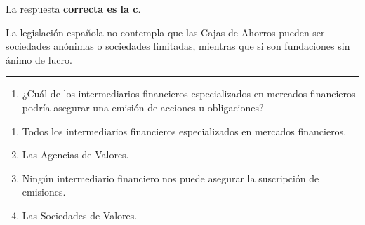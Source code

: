 \documentclass[
  letterpaper,
  DIV=11,
  numbers=noendperiod]{scrreprt}
\providecommand{\tightlist}{%
  \setlength{\itemsep}{0pt}\setlength{\parskip}{0pt}}\usepackage{longtable,booktabs,array}
\begin{document}
\begin{tcolorbox}[enhanced jigsaw, left=2mm, opacityback=0, colback=white, breakable, arc=.35mm, bottomrule=.15mm, rightrule=.15mm, toprule=.15mm, leftrule=.75mm, colframe=quarto-callout-tip-color-frame]
\begin{minipage}[t]{5.5mm}
\textcolor{quarto-callout-tip-color}{\faLightbulb}
\end{minipage}%
\begin{minipage}[t]{\textwidth - 5.5mm}

La respuesta \textbf{correcta es la c}.

La legislación española no contempla que las Cajas de Ahorros pueden ser
sociedades anónimas o sociedades limitadas, mientras que si son
fundaciones sin ánimo de lucro.

\end{minipage}%
\end{tcolorbox}

\begin{center}\rule{0.5\linewidth}{0.5pt}\end{center}

\begin{enumerate}
\def\labelenumi{\arabic{enumi}.}
\setcounter{enumi}{16}
\tightlist
\item
  ¿Cuál de los intermediarios financieros especializados en mercados
  financieros podría asegurar una emisión de acciones u obligaciones?
\end{enumerate}

\begin{enumerate}
\def\labelenumi{\alph{enumi})}
\item
  Todos los intermediarios financieros especializados en mercados
  financieros.
\item
  Las Agencias de Valores.
\item
  Ningún intermediario financiero nos puede asegurar la suscripción de
  emisiones.
\item
  Las Sociedades de Valores.
\end{enumerate}
\end{document}
